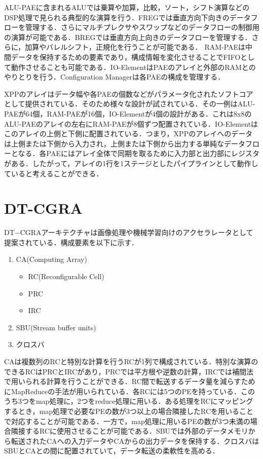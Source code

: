 {ALU-PAEに含まれるALUでは乗算や加算，比較，ソート，シフト演算などのDSP処理で見られる典型的な演算を行う．FREGでは垂直方向下向きのデータフローを管理する．さらにマルチプレクサやスワップなどのデータフローの制御用の演算が可能である．BREGでは垂直方向上向きのデータフローを管理する．さらに，加算やバレルシフト，正規化を行うことが可能である．
RAM-PAEは中間データを保持するための要素であり，構成情報を変化させることでFIFOとして動作させることも可能である．IO-ElementはPAEのアレイと外部のRAMとのやりとりを行う．Configuration Managerは各PAEの構成を管理する．

XPPのアレイはデータ幅や各PAEの個数などがパラメータ化されたソフトコアとして提供されている．そのため様々な設計が試されている．その一例はALU-PAEが64個，RAM-PAEが16個，IO-Elementが4個の設計がある．これは8x8のALU-PAEのアレイの左右にRAM-PAEが8個ずつ配置されている．IO-Elementはこのアレイの上側と下側に配置されている．つまり，XPPのアレイへのデータは上側または下側から入力され，上側または下側から出力する単純なデータフローとなる．各PAEにはアレイ全体で同期を取るために入力部と出力部にレジスタがある．したがって，アレイの1行を1ステージとしたパイプラインとして動作していると考えることができる．

\section{DT-CGRA}
\label{sec:DT-CGRA}
DT−CGRAアーキテクチャは画像処理や機械学習向けのアクセラレータとして提案されている．構成要素を以下に示す．
\begin{enumerate}
\item CA(Computing Array)
	\begin{itemize}
	\item RC(Reconfigurable Cell)
	\item PRC
	\item IRC
	\end{itemize}
\item SBU(Stream buffer units)
\item クロスバ
\end{enumerate}

CAは複数列のRCと特別な計算を行うRCが1列で構成されている．特別な演算のできるRCはPRCとIRCがあり，PRCでは平方根や逆数の計算，IRCでは補間法で用いられる計算を行うことができる．RC間で転送するデータ量を減らすためにMapReduceの手法が用いられている．各RCには5つのPEを持っている．このうち3つをmap処理に，2つをreduce処理に用いる．ある処理をRCにマッピングするとき，map処理で必要なPEの数が3つ以上の場合隣接したRCを用いることで対応することが可能である．一方で，map処理に用いるPEの数が3つ未満の場合隣接するRCに使用させることが可能である．SBUでは外部のデータメモリから転送されたCAへの入力データやCAからの出力データを保持する．クロスバはSBUとCAとの間に配置されていて，データ転送の柔軟性を高める．

}
